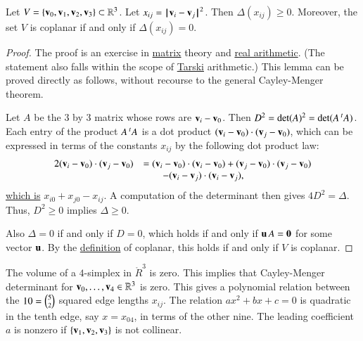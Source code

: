 \begin{lemma}[]\label{lemma:delta-pos}
  Let $V=\{{\mathbf v}_0,{\mathbf v}_1,{\mathbf v}_2,{\mathbf v}_3\}\subset\mathbb{R}^3$.  Let $x_{ij} =
  \norm{\v_i}{\v_j}^2$.  Then $\Delta(x_{ij})\ge 0$.  Moreover, the
  set $V$ is coplanar if and only if $\Delta(x_{ij}) = 0$.%
\end{lemma}

\begin{proof} The proof is an exercise in
  \hyperref[back:matrix]{matrix} theory and
  \hyperref[back:analysis]{real arithmetic}.  (The statement also
  falls within the scope of \hyperref[back:tarski]{Tarski}
  arithmetic.)  This lemma can be proved directly as follows, without
  recourse to the general Cayley-Menger theorem.

  Let $A$ be the $3$ by $3$ matrix whose rows are ${\mathbf v}_i - {\mathbf v}_0$.  Then
  $D^2 = \det(A)^2 = \det(A \,\hbox{}^t A)$.  Each entry of the
  product $A\,\hbox{}^tA$ is a dot product $({\mathbf v}_i-{\mathbf v}_0)\cdot
  ({\mathbf v}_j-{\mathbf v}_0)$, which can be expressed in terms of the constants
  $x_{ij}$ by the following dot product law:
\begin{equation}\label{eqn:dot-law}
\begin{array}{lll}
  2 ({\mathbf v}_i-{\mathbf v}_0)\cdot ({\mathbf v}_j-{\mathbf v}_0) 
&= ({\mathbf v}_i-{\mathbf v}_0)\cdot({\mathbf v}_i-{\mathbf v}_0) + ({\mathbf v}_j-{\mathbf v}_0)\cdot ({\mathbf v}_j-{\mathbf v}_0) \\
  &\qquad - ({\mathbf v}_i-{\mathbf v}_j)\cdot ({\mathbf v}_i-{\mathbf v}_j),
\end{array}
\end{equation}
\hyperref[def:norm]{which is} $x_{i0} + x_{j0} - x_{ij}$.
A computation of the determinant then gives $4D^2=\Delta$.
Thus, $D^2\ge0$ implies $\Delta\ge 0$.

Also $\Delta=0$ if and only if $D=0$, which holds if and only if ${\mathbf u}\,
A = {\mathbf 0}$ for some vector ${\mathbf u}$.  By the
\hyperref[def:plane]{definition} of coplanar, this holds if and only
if $V$ is coplanar.
\end{proof}

\begin{remark}[]
  The volume of a $4$-simplex in $\ring{R}^3$ is zero.  This implies
  that Cayley-Menger determinant for ${\mathbf v}_0,\ldots,{\mathbf v}_4\in\mathbb{R}^3$
  is zero.%
  This gives a polynomial relation between the $10 = \tbinom{5}{2}$
  squared edge lengths $x_{ij}$.  The relation $a x^2 + b x + c=0$ is
  quadratic in the tenth edge, say $x=x_{04}$, in terms of the other
  nine. The leading coefficient $a$ is nonzero if $\{{\mathbf v}_1,{\mathbf v}_2,{\mathbf v}_3\}$
  is not collinear.%
\end{remark}

